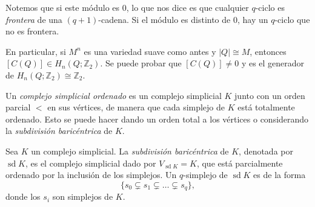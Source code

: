 \begin{nota}
Notemos que si este módulo es $0$, lo que nos dice es que cualquier $q$-ciclo es \textit{frontera} de una $(q+1)$-cadena. Si el módulo es distinto de $0$, hay un $q$-ciclo que no es frontera.

En particular, si $M^n$ es una variedad suave como antes y $|Q| \cong M$, entonces $[C(Q)] \in H_n(Q; \mathbb{Z}_2)$. Se puede probar que $[C(Q)] \neq 0$ y es el generador de $H_n(Q; \mathbb{Z}_2) \cong \mathbb{Z}_2$.
\end{nota}

\begin{definicion}
Un \textit{complejo simplicial ordenado} es un complejo simplicial $K$ junto con un orden parcial $<$ en sus vértices, de manera que cada simplejo de $K$ está totalmente ordenado. Esto se puede hacer dando un orden total a los vértices o considerando la \textit{subdivisión baricéntrica} de $K$.
\end{definicion}

\begin{definicion}
Sea $K$ un complejo simplicial. La \textit{subdivisión baricéntrica} de $K$, denotada por $\operatorname{sd} K$, es el complejo simplicial dado por $V_{\operatorname{sd} K} = K$, que está parcialmente ordenado por la inclusión de los simplejos. Un $q$-simplejo de $\operatorname{sd} K$ es de la forma
\[
\{ s_0 \subsetneq s_1 \subsetneq \dots \subsetneq s_q \},
\]
donde los $s_i$ son simplejos de $K$.
\end{definicion}

